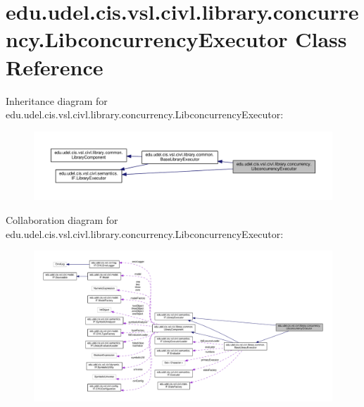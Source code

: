 \hypertarget{classedu_1_1udel_1_1cis_1_1vsl_1_1civl_1_1library_1_1concurrency_1_1LibconcurrencyExecutor}{}\section{edu.\+udel.\+cis.\+vsl.\+civl.\+library.\+concurrency.\+Libconcurrency\+Executor Class Reference}
\label{classedu_1_1udel_1_1cis_1_1vsl_1_1civl_1_1library_1_1concurrency_1_1LibconcurrencyExecutor}


Inheritance diagram for edu.\+udel.\+cis.\+vsl.\+civl.\+library.\+concurrency.\+Libconcurrency\+Executor\+:
\nopagebreak
\begin{figure}[H]
\begin{center}
\leavevmode
\includegraphics[width=350pt]{classedu_1_1udel_1_1cis_1_1vsl_1_1civl_1_1library_1_1concurrency_1_1LibconcurrencyExecutor__inherit__graph}
\end{center}
\end{figure}


Collaboration diagram for edu.\+udel.\+cis.\+vsl.\+civl.\+library.\+concurrency.\+Libconcurrency\+Executor\+:
\nopagebreak
\begin{figure}[H]
\begin{center}
\leavevmode
\includegraphics[width=350pt]{classedu_1_1udel_1_1cis_1_1vsl_1_1civl_1_1library_1_1concurrency_1_1LibconcurrencyExecutor__coll__graph}
\end{center}
\end{figure}
